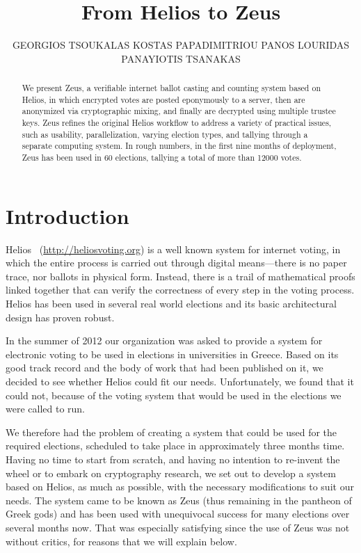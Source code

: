 \documentclass[jets]{usenixjournal}
\begin{document}
\title{\Large \bf From Helios to Zeus}

\author{GEORGIOS TSOUKALAS
KOSTAS PAPADIMITRIOU
PANOS LOURIDAS
PANAYIOTIS TSANAKAS
}

\begin{abstract}
We present Zeus, a verifiable internet ballot casting and counting
system based on Helios, in which encrypted votes are posted
eponymously to a server, then are anonymized via cryptographic mixing,
and finally are decrypted using multiple trustee keys. Zeus refines
the original Helios workflow to address a variety of practical issues,
such as usability, parallelization, varying election types, and
tallying through a separate computing system. In rough numbers, in the
first nine months of deployment, Zeus has been used in 60 elections,
tallying a total of more than 12000 votes.
\end{abstract}

\maketitle

\section{Introduction}

Helios~\cite{adida:2008} (\url{http://heliosvoting.org}) is a well
known system for internet voting, in which the entire process is
carried out through digital means---there is no paper trace, nor
ballots in physical form. Instead, there is a trail of mathematical
proofs linked together that can verify the correctness of every step
in the voting process. Helios has been used in several real world
elections and its basic architectural design has proven robust.

In the summer of 2012 our organization was asked to provide a system
for electronic voting to be used in elections in universities in
Greece. Based on its good track record and the body of work that had
been published on it, we decided to see whether Helios could fit our
needs. Unfortunately, we found that it could not, because of the
voting system that would be used in the elections we were called to
run.

We therefore had the problem of creating a system that could be used
for the required elections, scheduled to take place in approximately
three months time. Having no time to start from scratch, and having
no intention to re-invent the wheel or to embark on cryptography
research, we set out to develop a system based on Helios, as much as
possible, with the necessary modifications to suit our needs. The
system came to be known as Zeus (thus remaining in the pantheon of
Greek gods) and has been used with unequivocal success for many
elections over several months now. That was especially satisfying
since the use of Zeus was not without critics, for reasons that we
will explain below.
\end{document}
